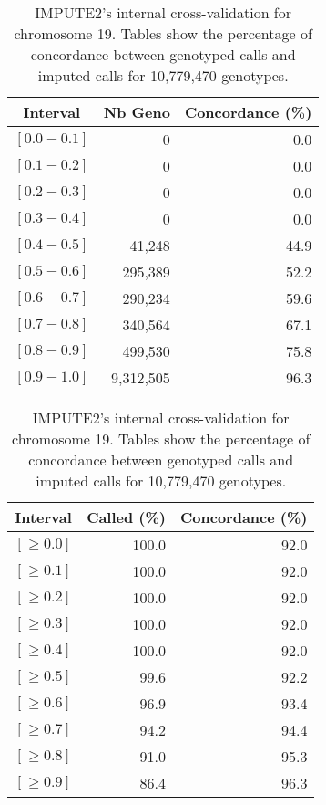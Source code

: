 \documentclass[10pt,twoside,english]{scrartcl}
\begin{document}
\begin{table}[H]
\protect\caption{IMPUTE2's internal cross-validation for chromosome 19. Tables show the
percentage of concordance between genotyped calls and imputed calls
for 10,779,470 genotypes.\label{tab:cross_validation_chr_19}}

\centering

\begin{tabular}{crr}
\hline 
\multicolumn{1}{c}{\textbf{Interval}}
 & \multicolumn{1}{c}{\textbf{Nb Geno}}
 & \multicolumn{1}{c}{\textbf{Concordance (\%)}}
\\
\hline 

$[0.0-0.1]$ & 0 & 0.0\\
$[0.1-0.2]$ & 0 & 0.0\\
$[0.2-0.3]$ & 0 & 0.0\\
$[0.3-0.4]$ & 0 & 0.0\\
$[0.4-0.5]$ & 41,248 & 44.9\\
$[0.5-0.6]$ & 295,389 & 52.2\\
$[0.6-0.7]$ & 290,234 & 59.6\\
$[0.7-0.8]$ & 340,564 & 67.1\\
$[0.8-0.9]$ & 499,530 & 75.8\\
$[0.9-1.0]$ & 9,312,505 & 96.3\\
\hline 
\end{tabular}
\hfill
\begin{tabular}{crr}
\hline 
\multicolumn{1}{c}{\textbf{Interval}}
 & \multicolumn{1}{c}{\textbf{Called (\%)}}
 & \multicolumn{1}{c}{\textbf{Concordance (\%)}}
\\
\hline 

$[\geq 0.0]$ & 100.0 & 92.0\\
$[\geq 0.1]$ & 100.0 & 92.0\\
$[\geq 0.2]$ & 100.0 & 92.0\\
$[\geq 0.3]$ & 100.0 & 92.0\\
$[\geq 0.4]$ & 100.0 & 92.0\\
$[\geq 0.5]$ & 99.6 & 92.2\\
$[\geq 0.6]$ & 96.9 & 93.4\\
$[\geq 0.7]$ & 94.2 & 94.4\\
$[\geq 0.8]$ & 91.0 & 95.3\\
$[\geq 0.9]$ & 86.4 & 96.3\\
\hline 
\end{tabular}


\end{table}
\end{document}
